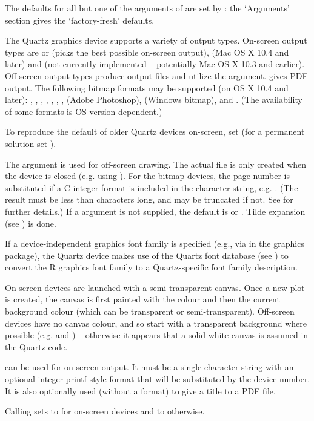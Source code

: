 %
\begin{Details}\relax
The defaults for all but one of the arguments of  are set
by : the `Arguments' section gives the
`factory-fresh' defaults.

The Quartz graphics device supports a variety of output types.
On-screen output types are  or  (picks the best
possible on-screen output),  (Mac OS X 10.4 and later)
and  (not currently implemented -- potentially
Mac OS X 10.3 and earlier).   Off-screen output
types produce output files and utilize the  argument.
 gives PDF output. The following bitmap formats may
be supported (on OS X 10.4 and later): , ,
, , , ,
,  (Adobe Photoshop),  (Windows
bitmap),  and .  (The availability of some
formats is OS-version-dependent.)

To reproduce the default of older Quartz devices on-screen, set
 (for a permanent solution set
).

The  argument is used for off-screen drawing.  The actual
file is only created when the device is closed (e.g. using
).  For the bitmap devices, the page number is
substituted if a C integer format is included in the character string,
e.g. .  (The result must be less than
 characters long, and may be truncated if not. See
 for further details.)  If a 
argument is not supplied, the default is  or
.  Tilde expansion
(see ) is done.


If a device-independent \R{} graphics font family is specified
(e.g., via  in the graphics package),
the Quartz device makes use of the Quartz font database
(see ) to convert the R graphics font family
to a Quartz-specific font family description.

On-screen devices are launched with a semi-transparent canvas.  Once a
new plot is created, the canvas is first painted with the
 colour and then the current background colour (which can
be transparent or semi-transparent).  Off-screen devices have no
canvas colour, and so start with a transparent background where
possible (e.g.  and ) -- otherwise
it appears that a solid white canvas is assumed in the Quartz code.

 can be used for on-screen output.  It must be a single
character string with an optional integer printf-style format that
will be substituted by the device number.  It is also optionally used
(without a format) to give a title to a PDF file.

Calling  sets  to 
for on-screen devices and to  otherwise.
\end{Details}
